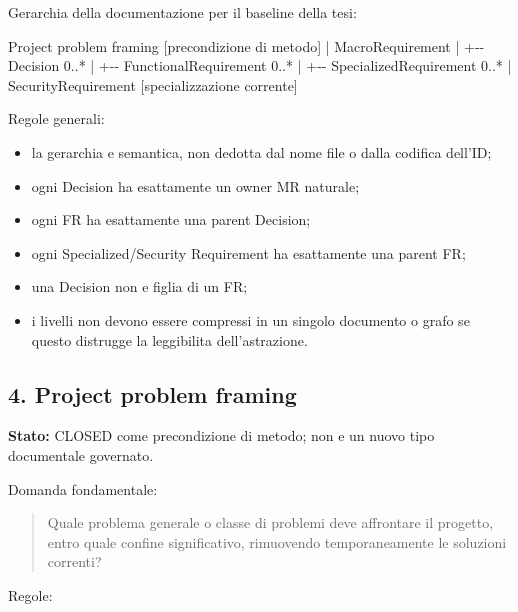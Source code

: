 \documentclass[
  9pt,
  a4paper,
]{article}
\newenvironment{Shaded}{}{}
\newcommand{\NormalTok}[1]{#1}
\providecommand{\tightlist}{%
  \setlength{\itemsep}{0pt}\setlength{\parskip}{0pt}}
\begin{document}
Gerarchia della documentazione per il baseline della tesi:

\begin{Shaded}
\begin{Highlighting}[]
\NormalTok{Project problem framing   [precondizione di metodo]}
\NormalTok{        |}
\NormalTok{MacroRequirement}
\NormalTok{        |}
\NormalTok{        +{-}{-} Decision 0..*}
\NormalTok{               |}
\NormalTok{               +{-}{-} FunctionalRequirement 0..*}
\NormalTok{                      |}
\NormalTok{                      +{-}{-} SpecializedRequirement 0..*}
\NormalTok{                             |}
\NormalTok{                             \textasciigrave{}{-}{-} SecurityRequirement [specializzazione corrente]}
\end{Highlighting}
\end{Shaded}

Regole generali:

\begin{itemize}
\tightlist
\item
  la gerarchia e semantica, non dedotta dal nome file o dalla codifica
  dell'ID;
\item
  ogni Decision ha esattamente un owner MR naturale;
\item
  ogni FR ha esattamente una parent Decision;
\item
  ogni Specialized/Security Requirement ha esattamente una parent FR;
\item
  una Decision non e figlia di un FR;
\item
  i livelli non devono essere compressi in un singolo documento o grafo
  se questo distrugge la leggibilita dell'astrazione.
\end{itemize}

\subsection{4. Project problem framing}\label{project-problem-framing}

\textbf{Stato:} CLOSED come precondizione di metodo; non e un nuovo tipo
documentale governato.

Domanda fondamentale:

\begin{quote}
Quale problema generale o classe di problemi deve affrontare il
progetto, entro quale confine significativo, rimuovendo temporaneamente
le soluzioni correnti?
\end{quote}

Regole:
\end{document}
